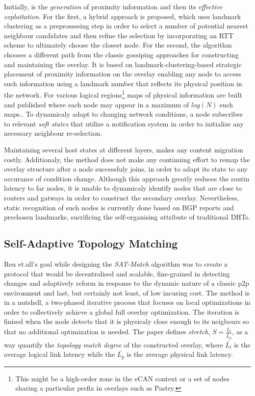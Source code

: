 \documentclass[a4paper,10pt]{article}
\begin{document}
Initially, is the \emph{generation} of proximity information and then its \emph{effective exploitation}. For the first, a hybrid approach is proposed, which uses landmark clustering as a preprossesing step in order to select a number of potential nearest neighbour candidates and then refine the selection by incorporating an RTT scheme to ultimately choose the closest node. For the second, the algorithm chooses a different path from the classic gossiping approaches for constructing and maintaining the overlay. It is based on landmark-clustering-based strategic placement of proximity information on the overlay enabling any node to access such information using a landmark number that reflects its physical position in the network. For various logical regions\footnote{This might be a high-order zone in the eCAN\cite{xu_ecan_2002} context or a set of nodes sharing a particular prefix in overlays such as Pastry.} maps of physical information are built and published where each node may appear in a maximum of $log\left( N \right)$ such maps.. To dynamicaly adapt to changing network conditions, a node subscribes to relevant \emph{soft states} that utilize a notification system in order to initialize any necessary neighbour re-selection.

Maintaining several host states at different layers, makes any content migration costly. Additionaly, the method does not make any continuing effort to remap the overlay structure after a node successfuly joins, in order to adapt its state to any occurance of condition change. Although this approach greatly reduces the routin latency to far nodes, it is unable to dynamicaly identify nodes that are close to routers and gatways in order to construct the secondary overlay. Nevertheless, static recognition of such nodes is currently done based on BGP reports and prechosen landmarks, sucrificing the self-organising attribute of traditional DHTs.

\subsection{Self-Adaptive Topology Matching}
Ren et.all's goal while designing the \emph{SAT-Match} algorithm \cite{ren_satmatch_2004} was to create a protocol that would be decentralised and scalable, fine-grained in detecting changes and adaptively reform in response to the dynamic nature of a classic p2p environment and last, but certainly not least, of low incuring cost. The method is in a nutshell, a two-phased iterative process that focuses on local optimizations in order to collectively achieve a global full overlay optimization.  The iteration is finised when the node detects that it is physicaly close enough to its neigbours so that no additional optimization is needed. The paper defines \emph{stretch}, $S = \frac{\bar{L_l}}{\bar{L_p}}$, as a way quantify the \emph{topology match degree} of the constructed overlay, where $\bar{L_l}$ is the average logical link latency while the $\bar{L_p}$ is the average physical link latency.
\end{document}
